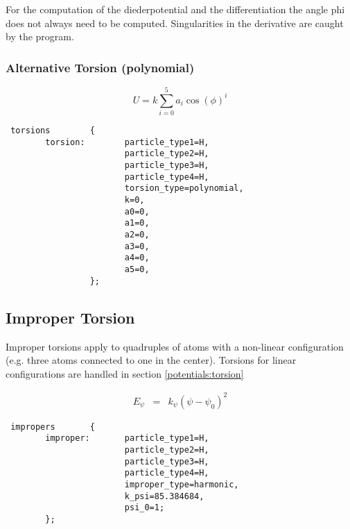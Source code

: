 For the computation of the diederpotential and the differentiation the
angle phi does not always need to be computed. Singularities in the
derivative are caught by the program.


\subsubsection{Alternative Torsion (polynomial)}


\begin{equation}
U = k \sum_{i=0}^{5} a_i \cos{(\phi)}^i
\end{equation}


\begin{lstlisting}
 torsions        {
        torsion:        particle_type1=H,
                        particle_type2=H,
                        particle_type3=H,
                        particle_type4=H,
                        torsion_type=polynomial,
                        k=0,
                        a0=0,
                        a1=0,
                        a2=0,
                        a3=0,
                        a4=0,
                        a5=0,
                 };
\end{lstlisting}


\subsection{Improper Torsion} \label{potentials:improper_torsion}

Improper torsions apply to quadruples of atoms with a non-linear configuration
(e.g. three atoms connected to one in the center). Torsions for linear configurations
are handled in section \ref{potentials:torsion}



\begin{eqnarray*}
E_{\psi} &=& k_{\psi} ( \psi - \psi_0)^2
\end{eqnarray*}

\begin{lstlisting}
 impropers       {
        improper:       particle_type1=H,
                        particle_type2=H,
                        particle_type3=H,
                        particle_type4=H,
                        improper_type=harmonic,
                        k_psi=85.384684,
                        psi_0=1;
        };
\end{lstlisting}


